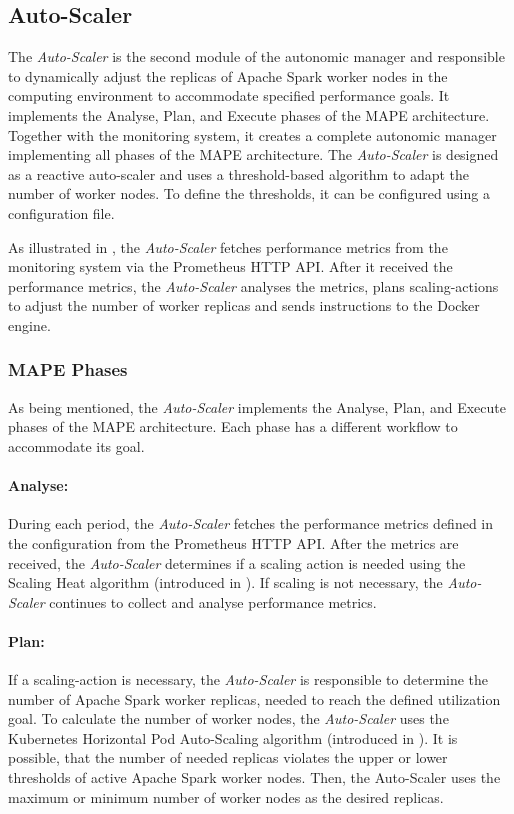 \subsection{Auto-Scaler}
The \textit{Auto-Scaler} is the second module of the autonomic manager and responsible to dynamically adjust the replicas of Apache Spark worker nodes in the computing environment to accommodate specified performance goals. 
It implements the Analyse, Plan, and Execute phases of the MAPE architecture. Together with the monitoring system, it creates a complete autonomic manager implementing all phases of the MAPE architecture.
The \textit{Auto-Scaler} is designed as a reactive auto-scaler and uses a threshold-based algorithm to adapt the number of worker nodes. To define the thresholds, it can be configured using a configuration file.


As illustrated in , the \textit{Auto-Scaler} fetches performance metrics from the monitoring system via the Prometheus HTTP API.
After it received the performance metrics, the \textit{Auto-Scaler} analyses the metrics, plans scaling-actions to adjust the number of worker replicas and sends instructions to the Docker engine.


\subsubsection{MAPE Phases}
As being mentioned, the \textit{Auto-Scaler} implements the Analyse, Plan, and Execute phases of the MAPE architecture. Each phase has a different workflow to accommodate its goal.

\paragraph{Analyse:}
During each period, the \textit{Auto-Scaler} fetches the performance metrics defined in the configuration from the Prometheus HTTP API.
After the metrics are received, the \textit{Auto-Scaler} determines if a scaling action is needed using the Scaling Heat algorithm (introduced in ). If scaling is not necessary, the \textit{Auto-Scaler} continues to collect and analyse performance metrics.

\paragraph{Plan:}
If a scaling-action is necessary, the \textit{Auto-Scaler} is responsible to determine the number of Apache Spark worker replicas, needed to reach the defined utilization goal.
To calculate the number of worker nodes, the \textit{Auto-Scaler} uses the Kubernetes Horizontal Pod Auto-Scaling algorithm (introduced in ).
It is possible, that the number of needed replicas violates the upper or lower thresholds of active Apache Spark worker nodes. Then, the Auto-Scaler uses the maximum or minimum number of worker nodes as the desired replicas.

